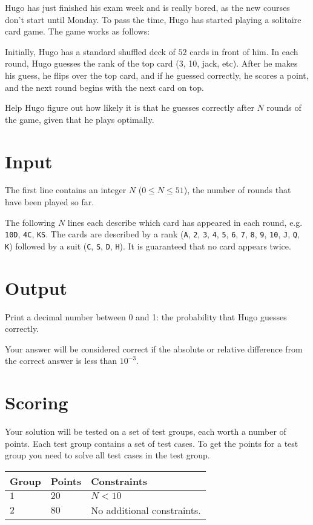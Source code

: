 Hugo has just finished his exam week and is really bored, as the new courses don't start until Monday.
To pass the time, Hugo has started playing a solitaire card game. The game works as follows:

Initially, Hugo has a standard shuffled deck of $52$ cards in front of him. In each round, Hugo guesses the rank of the top card (3, 10, jack, etc).
After he makes his guess, he flips over the top card, and if he guessed correctly, he scores a point, and the next round begins with the next card on top.

Help Hugo figure out how likely it is that he guesses correctly after $N$ rounds of the game, given that he plays optimally.

\section*{Input}
The first line contains an integer $N$ ($0 \le N \le 51$), the number of rounds that have been played so far.

The following $N$ lines each describe which card has appeared in each round, e.g. \texttt{10D}, \texttt{4C}, \texttt{KS}.
The cards are described by a rank (\texttt{A}, \texttt{2}, \texttt{3}, \texttt{4}, \texttt{5}, \texttt{6}, \texttt{7}, \texttt{8},
\texttt{9}, \texttt{10}, \texttt{J}, \texttt{Q}, \texttt{K}) followed by a suit (\texttt{C}, \texttt{S}, \texttt{D}, \texttt{H}).
It is guaranteed that no card appears twice.

\section*{Output}
Print a decimal number between 0 and 1: the probability that Hugo guesses correctly.

Your answer will be considered correct if the absolute or relative difference from the correct answer is less than $10^{-3}$.


\section*{Scoring}
Your solution will be tested on a set of test groups, each worth a number of points. Each test group contains
a set of test cases. To get the points for a test group you need to solve all test cases in the test group.

\noindent
\begin{tabular}{| l | l | p{12cm} |}
  \hline
  \textbf{Group} & \textbf{Points} & \textbf{Constraints} \\ \hline
  $1$    & $20$       & $N < 10$ \\ \hline
  $2$    & $80$       & No additional constraints. \\ \hline
\end{tabular}

